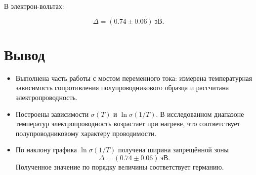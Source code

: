 \documentclass[a4paper,12pt]{article}
\begin{document}
В электрон-вольтах:

\begin{equation}
    \Delta = (0.74 \pm 0.06)~\text{эВ}.
\end{equation}

\FloatBarrier
\section{Вывод}

\begin{itemize}
    \item Выполнена часть работы с мостом переменного тока: измерена температурная зависимость сопротивления полупроводникового образца и рассчитана электропроводность.

    \item Построены зависимости $\sigma(T)$ и $\ln \sigma(1/T)$. В исследованном диапазоне температур электропроводность возрастает при нагреве, что соответствует полупроводниковому характеру проводимости.

    \item По наклону графика $\ln \sigma(1/T)$ получена ширина запрещённой зоны
    \[
        \Delta = (0.74 \pm 0.06)~\text{эВ}.
    \]
    Полученное значение по порядку величины соответствует германию.
\end{itemize}
\end{document}
